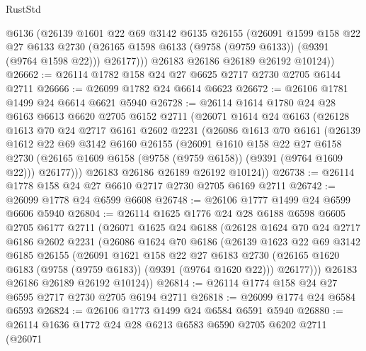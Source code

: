 \begin{lexlean}{RustStd}
\begin{coremodule}
          @6136
          (@26139
            @1601
            @22
            @69
            @3142
            @6135
            @26155
            (@26091
              @1599
              @158
              @22
              @27
              @6133
              @2730
              (@26165 @1598 @6133 (@9758 (@9759 @6133)) (@9391 (@9764 @1598 @22)))
              @26177)))
        @26183
        @26186
        @26189
        @26192
        @10124))
@26662 := @26114 @1782 @158 @24 @27 @6625 @2717 @2730 @2705 @6144 @2711
@26666 := @26099 @1782 @24 @6614 @6623
@26672 := @26106 @1781 @1499 @24 @6614 @6621 @5940
@26728 := @26114
    @1614
    @1780
    @24
    @28
    @6163
    @6613
    @6620
    @2705
    @6152
    @2711
    (@26071
      @1614
      @24
      @6163
      (@26128
        @1613
        @70
        @24
        @2717
        @6161
        @2602
        @2231
        (@26086
          @1613
          @70
          @6161
          (@26139
            @1612
            @22
            @69
            @3142
            @6160
            @26155
            (@26091
              @1610
              @158
              @22
              @27
              @6158
              @2730
              (@26165 @1609 @6158 (@9758 (@9759 @6158)) (@9391 (@9764 @1609 @22)))
              @26177)))
        @26183
        @26186
        @26189
        @26192
        @10124))
@26738 := @26114 @1778 @158 @24 @27 @6610 @2717 @2730 @2705 @6169 @2711
@26742 := @26099 @1778 @24 @6599 @6608
@26748 := @26106 @1777 @1499 @24 @6599 @6606 @5940
@26804 := @26114
    @1625
    @1776
    @24
    @28
    @6188
    @6598
    @6605
    @2705
    @6177
    @2711
    (@26071
      @1625
      @24
      @6188
      (@26128
        @1624
        @70
        @24
        @2717
        @6186
        @2602
        @2231
        (@26086
          @1624
          @70
          @6186
          (@26139
            @1623
            @22
            @69
            @3142
            @6185
            @26155
            (@26091
              @1621
              @158
              @22
              @27
              @6183
              @2730
              (@26165 @1620 @6183 (@9758 (@9759 @6183)) (@9391 (@9764 @1620 @22)))
              @26177)))
        @26183
        @26186
        @26189
        @26192
        @10124))
@26814 := @26114 @1774 @158 @24 @27 @6595 @2717 @2730 @2705 @6194 @2711
@26818 := @26099 @1774 @24 @6584 @6593
@26824 := @26106 @1773 @1499 @24 @6584 @6591 @5940
@26880 := @26114
    @1636
    @1772
    @24
    @28
    @6213
    @6583
    @6590
    @2705
    @6202
    @2711
    (@26071

\end{coremodule}
\end{lexlean}
